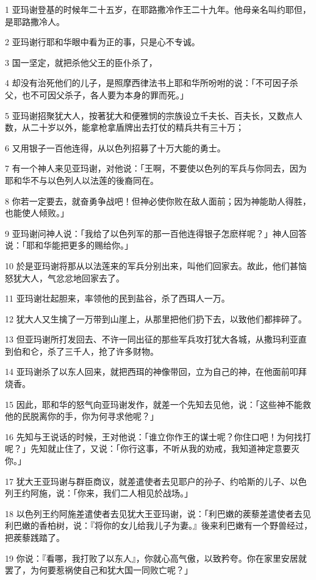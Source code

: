\par 1 亚玛谢登基的时候年二十五岁，在耶路撒冷作王二十九年。他母亲名叫约耶但，是耶路撒冷人。
\par 2 亚玛谢行耶和华眼中看为正的事，只是心不专诚。
\par 3 国一坚定，就把杀他父王的臣仆杀了，
\par 4 却没有治死他们的儿子，是照摩西律法书上耶和华所吩咐的说：「不可因子杀父，也不可因父杀子，各人要为本身的罪而死。」
\par 5 亚玛谢招聚犹大人，按著犹大和便雅悯的宗族设立千夫长、百夫长，又数点人数，从二十岁以外，能拿枪拿盾牌出去打仗的精兵共有三十万；
\par 6 又用银子一百他连得，从以色列招募了十万大能的勇士。
\par 7 有一个神人来见亚玛谢，对他说：「王啊，不要使以色列的军兵与你同去，因为耶和华不与以色列人以法莲的後裔同在。
\par 8 你若一定要去，就奋勇争战吧！但神必使你败在敌人面前；因为神能助人得胜，也能使人倾败。」
\par 9 亚玛谢问神人说：「我给了以色列军的那一百他连得银子怎麽样呢？」神人回答说：「耶和华能把更多的赐给你。」
\par 10 於是亚玛谢将那从以法莲来的军兵分别出来，叫他们回家去。故此，他们甚恼怒犹大人，气忿忿地回家去了。
\par 11 亚玛谢壮起胆来，率领他的民到盐谷，杀了西珥人一万。
\par 12 犹大人又生擒了一万带到山崖上，从那里把他们扔下去，以致他们都摔碎了。
\par 13 但亚玛谢所打发回去、不许一同出征的那些军兵攻打犹大各城，从撒玛利亚直到伯和仑，杀了三千人，抢了许多财物。
\par 14 亚玛谢杀了以东人回来，就把西珥的神像带回，立为自己的神，在他面前叩拜烧香。
\par 15 因此，耶和华的怒气向亚玛谢发作，就差一个先知去见他，说：「这些神不能救他的民脱离你的手，你为何寻求他呢？」
\par 16 先知与王说话的时候，王对他说：「谁立你作王的谋士呢？你住口吧！为何找打呢？」先知就止住了，又说：「你行这事，不听从我的劝戒，我知道神定意要灭你。」
\par 17 犹大王亚玛谢与群臣商议，就差遣使者去见耶户的孙子、约哈斯的儿子、以色列王约阿施，说：「你来，我们二人相见於战场。」
\par 18 以色列王约阿施差遣使者去见犹大王亚玛谢，说：「利巴嫩的蒺藜差遣使者去见利巴嫩的香柏树，说：『将你的女儿给我儿子为妻。』後来利巴嫩有一个野兽经过，把蒺藜践踏了。
\par 19 你说：『看哪，我打败了以东人』，你就心高气傲，以致矜夸。你在家里安居就罢了，为何要惹祸使自己和犹大国一同败亡呢？」
